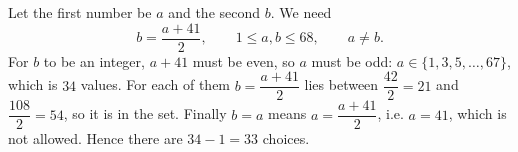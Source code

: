 Let the first number be $a$ and the second $b$. We need
\[b=\dfrac{a+41}{2},\qquad 1\le a,b\le68,\qquad a\ne b.\]
For $b$ to be an integer, $a+41$ must be even, so $a$ must be odd: $a\in\{1,3,5,\dots,67\}$, which is $34$ values. For each of them $b=\dfrac{a+41}{2}$ lies between $\dfrac{42}{2}=21$ and $\dfrac{108}{2}=54$, so it is in the set. Finally $b=a$ means $a=\dfrac{a+41}{2}$, i.e. $a=41$, which is not allowed. Hence there are $34-1=\boxed{33}$ choices.
